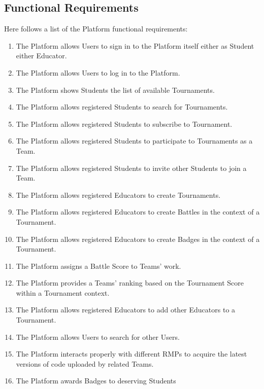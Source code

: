 \newpage

\subsection{Functional Requirements}
Here follows a list of the Platform functional requirements:
\begin{enumerate}[label= \textbf{R\arabic*}]
    \item The Platform allows Users to sign in to the Platform itself either as Student either Educator. \label{req:reqSignin}
    \item The Platform allows Users to log in to the Platform. \label{req:reqLogin}
    \item The Platform shows Students the list of available Tournaments. \label{req:reqShowTournaments}
    \item The Platform allows registered Students to search for Tournaments. \label{req:reqSearchForTournament}
    \item The Platform allows registered Students to subscribe to Tournament. \label{req:reqTournamentSubscription}
    \item The Platform allows registered Students to participate to Tournaments as a Team. \label{req:reqCreateTeam}
    \item The Platform allows registered Students to invite other Students to join a Team. \label{req:reqJoinTeam}
    \item The Platform allows registered Educators to create Tournaments. \label{req:reqCreateTournaments}
    \item The Platform allows registered Educators to create Battles in the context of a Tournament. \label{req:reqCreateBattle}
    \item The Platform allows registered Educators to create Badges in the context of a Tournament. \label{req:reqCreateBadge}
    \item The Platform assigns a Battle Score to Teams' work. \label{req:reqEvaluateCode}
    \item The Platform provides a Teams' ranking based on the Tournament Score within a Tournament context. \label{req:reqRankingsUpdate}
    \item The Platform allows registered Educators to add other Educators to a Tournament. \label{req:reqJoinManagement}
    \item The Platform allows Users to search for other Users. \label{req:reqSearchForUsers}
    \item The Platform interacts properly with different RMPs to acquire the latest versions of code uploaded by related Teams. \label{req:reqPullRMP}
    \item The Platform awards Badges to deserving Students \label{req:reqAssignBadge}
\end{enumerate}

